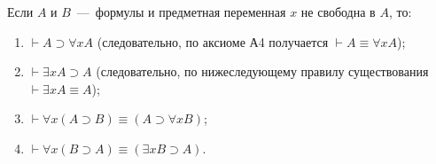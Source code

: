 \begin{lemma}\label{th:exists_theorems}
    Если $A$ и $B$~---~формулы и предметная переменная $x$ не свободна в $A$, то:
    \begin{enumerate}[label=\arabic*)]
        \item $\vdash A \supset \forall xA$ (следовательно, по аксиоме А4 получается $\vdash A \equiv \forall xA$);
        \item $\vdash \exists xA \supset A$ (следовательно, по нижеследующему правилу существования $\vdash \exists xA \equiv A$);
        \item $\vdash \forall x(A \supset B) \equiv (A \supset \forall xB)$;
        \item $\vdash \forall x(B \supset A) \equiv (\exists xB \supset A)$.
    \end{enumerate}
\end{lemma}
